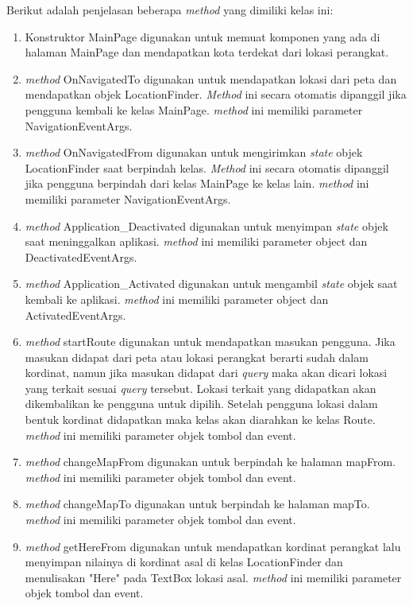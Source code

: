 Berikut adalah penjelasan beberapa \textit{method} yang dimiliki kelas ini:
\begin{enumerate}
	\item Konstruktor MainPage digunakan untuk memuat komponen yang ada di halaman MainPage dan mendapatkan kota terdekat dari lokasi perangkat.
	\item \textit{method} OnNavigatedTo digunakan untuk mendapatkan lokasi dari peta dan mendapatkan objek LocationFinder. \textit{Method} ini secara otomatis dipanggil jika pengguna kembali ke kelas MainPage. \textit{method} ini memiliki parameter NavigationEventArgs.
	\item \textit{method} OnNavigatedFrom digunakan untuk mengirimkan \textit{state} objek LocationFinder saat berpindah kelas. \textit{Method} ini secara otomatis dipanggil jika pengguna berpindah dari kelas MainPage ke kelas lain. \textit{method} ini memiliki parameter NavigationEventArgs.
	\item \textit{method} Application\_Deactivated digunakan untuk menyimpan \textit{state} objek saat meninggalkan aplikasi. \textit{method} ini memiliki parameter object dan DeactivatedEventArgs.
	\item \textit{method} Application\_Activated digunakan untuk mengambil \textit{state} objek saat kembali ke aplikasi. \textit{method} ini memiliki parameter object dan ActivatedEventArgs.
	\item \textit{method} startRoute digunakan untuk mendapatkan masukan pengguna. Jika masukan didapat dari peta atau lokasi perangkat berarti sudah dalam kordinat, namun jika masukan didapat dari \textit{query} maka akan dicari lokasi yang terkait sesuai \textit{query} tersebut. Lokasi terkait yang didapatkan akan dikembalikan ke pengguna untuk dipilih. Setelah pengguna lokasi dalam bentuk kordinat didapatkan maka kelas akan diarahkan ke kelas Route. \textit{method} ini memiliki parameter objek tombol dan event.
	\item \textit{method} changeMapFrom digunakan untuk berpindah ke halaman mapFrom. \textit{method} ini memiliki parameter objek tombol dan event.
	\item \textit{method} changeMapTo digunakan untuk berpindah ke halaman mapTo. \textit{method} ini memiliki parameter objek tombol dan event.
	\item \textit{method} getHereFrom digunakan untuk mendapatkan kordinat perangkat lalu menyimpan nilainya di kordinat asal di kelas LocationFinder dan menulisakan "Here" pada TextBox lokasi asal. \textit{method} ini memiliki parameter objek tombol dan event.

\end{enumerate}
